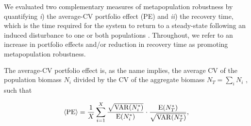 \documentclass{revtex4}
\begin{document}


\noindent We evaluated two complementary measures of metapopulation robustness by quantifying \emph{i}) the average-CV portfolio effect (PE) \citep{Anderson:2014cx,Schindler:2015gf} and \emph{ii}) the recovery time, which is the time required for the system to return to a steady-state following an induced disturbance to one or both populations \citep{Ovaskainen:2002il}.
Throughout, we refer to an increase in portfolio effects and/or reduction in recovery time as promoting metapopulation robustness.

The average-CV portfolio effect is, as the name implies, the average CV of the population biomass $N_i$ divided by the CV of the aggregate biomass $N_T=\sum_i N_i$ \citep{Anderson:2013gb}, such that

\begin{equation}
\langle{\rm PE}\rangle =\frac{1}{X}\sum_{i=1}^{X} \frac{\sqrt{{\rm VAR}(N_i^*)}}{{\rm E}(N_i^*)}\cdot \frac{{\rm E}(N_T^*)}{\sqrt{{\rm VAR}(N_T^*)}},
\label{eq:pe}
\end{equation}
\end{document}
